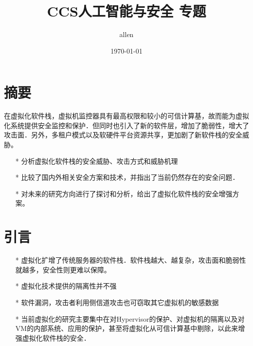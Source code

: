 \documentclass[UTF8]{ctexart}
\title{\heiti CCS人工智能与安全 专题}
\author{\kaishu allen}
\date{\today}
\begin{document}
    
    \maketitle

    \clearpage
    \section{摘要}\label{sec:diyijie}
	在虚拟化软件栈，虚拟机监控器具有最高权限和较小的可信计算基，故而能为虚拟化系统提供安全监控和保护．但同时也引入了新的软件层，增加了脆弱性，增大了攻击面．另外，多租户模式以及软硬件平台资源共享，更加剧了新软件栈的安全威胁。
	\begin{itemize}
	\item[*] 分析虚拟化软件栈的安全威胁、攻击方式和威胁机理
	\item[*] 比较了国内外相关安全方案和技术，并指出了当前仍然存在的安全问题．
	\item[*] 对未来的研究方向进行了探讨和分析，给出了虚拟化软件栈的安全增强方案。
	\end{itemize}
	\clearpage
	
    \section{引言}\label{sec:dierjie}
	\begin{itemize}
	\item[*] 虚拟化扩增了传统服务器的软件栈．软件栈越大、越复杂，攻击面和脆弱性就越多，安全性则更难以保障。
	\item[*] 虚拟化技术提供的隔离性并不强
	\item[*] 软件漏洞，攻击者利用侧信道攻击也可窃取其它虚拟机的敏感数据
	\item[*] 当前虚拟化的研究主要集中在对Hypervisor的保护、对虚拟机的隔离以及对VM的内部系统、应用的保护，甚至将虚拟化从可信计算基中剔除，以此来增强虚拟化软件栈的安全．
	\end{itemize}
	\clearpage
	
	
\end{document}
